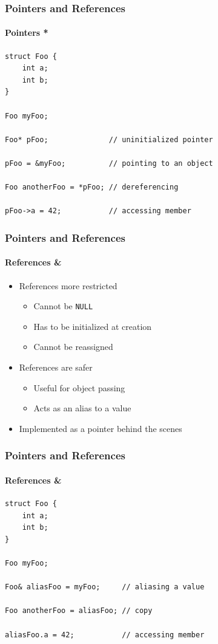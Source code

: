 \documentclass[table]{beamer}
\newcommand{\declarelesson}{\textbf{\color{themegreen}{Lesson:}} }
\begin{document}
\begin{frame}[fragile]
    \frametitle{\declarelesson Pointers and References}
    \framesubtitle{Pointers *}
    \begin{lstlisting}[title=Pointer Usage]
struct Foo {
    int a;
    int b;
}

Foo myFoo;

Foo* pFoo;              // uninitialized pointer

pFoo = &myFoo;          // pointing to an object

Foo anotherFoo = *pFoo; // dereferencing

pFoo->a = 42;           // accessing member
    \end{lstlisting}
\end{frame}

\begin{frame}
    \frametitle{\declarelesson Pointers and References}
    \framesubtitle{References \&}
    \begin{itemize}
        \item References more restricted
            \begin{itemize}
                \item Cannot be \texttt{NULL}
                \item Has to be initialized at creation
                \item Cannot be reassigned
            \end{itemize}
        \item References are safer
            \begin{itemize}
                \item Useful for object passing
                \item Acts as an alias to a value
            \end{itemize}
        \item Implemented as a pointer behind the scenes
    \end{itemize}
\end{frame}

\begin{frame}[fragile]
    \frametitle{\declarelesson Pointers and References}
    \framesubtitle{References \&}
    \begin{lstlisting}[title=Reference Usage]
struct Foo {
    int a;
    int b;
}

Foo myFoo;

Foo& aliasFoo = myFoo;     // aliasing a value

Foo anotherFoo = aliasFoo; // copy

aliasFoo.a = 42;           // accessing member
    \end{lstlisting}
\end{frame}
\end{document}
